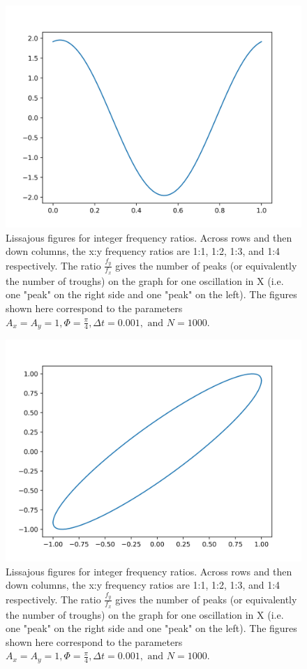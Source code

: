 \documentclass{article}
\begin{document}
\begin{figure}[H]
\includegraphics[width=\textwidth]{a1img2.png}
\caption{Lissajous figures for integer frequency ratios. Across rows and then down columns, the x:y frequency ratios are 1:1, 1:2, 1:3, and 1:4 respectively. The ratio $\frac{f_y}{f_x}$ gives the number of peaks (or equivalently the number of troughs) on the graph for one oscillation in X (i.e. one "peak" on the right side and one "peak" on the left). The figures shown here correspond to the parameters $A_x = A_y = 1, \Phi = \frac{\pi}{4}, \Delta t = 0.001,\text{ and }N = 1000.$}
\end{figure}
\begin{figure}[H]
\includegraphics[width=\textwidth]{a1img3.png}
\caption{Lissajous figures for integer frequency ratios. Across rows and then down columns, the x:y frequency ratios are 1:1, 1:2, 1:3, and 1:4 respectively. The ratio $\frac{f_y}{f_x}$ gives the number of peaks (or equivalently the number of troughs) on the graph for one oscillation in X (i.e. one "peak" on the right side and one "peak" on the left). The figures shown here correspond to the parameters $A_x = A_y = 1, \Phi = \frac{\pi}{4}, \Delta t = 0.001,\text{ and }N = 1000.$}
\end{figure}
\end{document}
